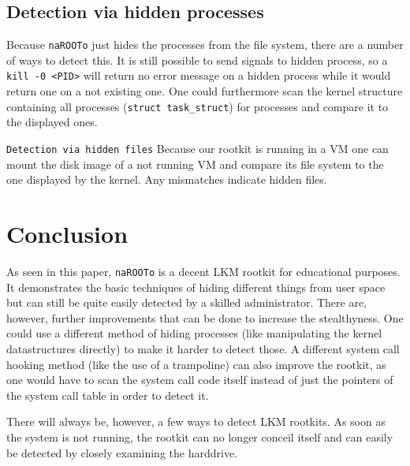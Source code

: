 \documentclass[10pt, letterpaper]{scrartcl}
\begin{document}
\subsection{Detection via hidden processes}
Because \texttt{naROOTo} just hides the processes from the file system, there are a number of ways to detect this.
It is still possible to send signals to hidden process, so a \texttt{kill -0 <PID>} will return no error message on a hidden process while it would return one on a not existing one.
One could furthermore scan the kernel structure containing all processes (\texttt{struct task\_struct}) for processes and compare it to the displayed ones.

\texttt{Detection via hidden files}
Because our rootkit is running in a VM one can mount the disk image of a not running VM and compare its file system to the one displayed by the kernel. 
Any mismatches indicate hidden files.


\section{Conclusion}
As seen in this paper, \texttt{naROOTo} is a decent LKM rootkit for educational purposes.
It demonstrates the basic techniques of hiding different things from user space but can still be quite easily detected by a skilled administrator.
There are, however, further improvements that can be done to increase the stealthyness.
One could use a different method of hiding processes (like manipulating the kernel datastructures directly) to make it harder to detect those.
A different system call hooking method (like the use of a trampoline) can also improve the rootkit, as one would have to scan the system call code itself instead of just the pointers of the system call table in order to detect it.

There will always be, however, a few ways to detect LKM rootkits. As soon as the system is not running, the rootkit can no longer conceil itself and can easily be detected by closely examining the harddrive.
\end{document}
